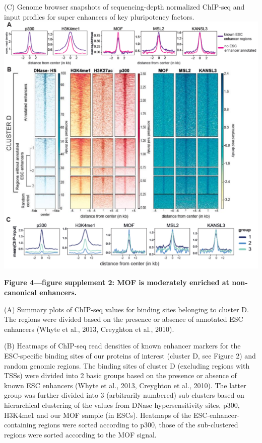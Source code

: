 \begin{footnotesize}
\begin{sffamily}
\begin{singlespacing}
(C) Genome browser snapshots of sequencing-depth normalized ChIP-seq and input profiles for super enhancers of key pluripotency factors.
\newpage
\includegraphics[width=\textwidth]{Figures/Appendix/Figure4_supplemental_figure2_scissored.pdf}

\textbf{Figure 4—figure supplement 2: MOF is moderately enriched at non-canonical enhancers.}

(A) Summary plots of ChIP-seq values for binding sites belonging to cluster D. The regions were divided based on the presence or absence of annotated ESC enhancers (Whyte et al., 2013, Creyghton et al., 2010).

(B) Heatmaps of ChIP-seq read densities of known enhancer markers for the ESC-specific binding sites of our proteins of interest (cluster D, see Figure 2) and random genomic regions. The binding sites of cluster D (excluding regions with TSSs) were divided into 2 basic groups based on the presence or absence of known ESC enhancers (Whyte et al., 2013, Creyghton et al., 2010). The latter group was further divided into 3 (arbitrarily numbered) sub-clusters based on hierarchical clustering of the values from DNase hypersensitivity sites, p300, H3K4me1 and our MOF sample (in ESCs). Heatmaps of the ESC-enhancer-containing regions were sorted according to p300, those of the sub-clustered regions were sorted according to the MOF signal.


\end{singlespacing}
\end{sffamily}
\end{footnotesize}
